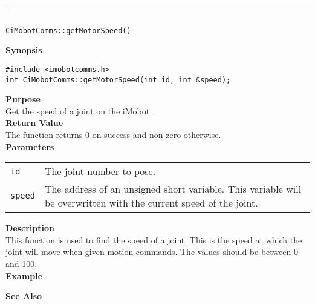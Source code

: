 \noindent
\vspace{5pt}
\rule{4.5in}{0.015in}\\
\noindent
{\LARGE \texttt{CiMobotComms::getMotorSpeed()}}\\
{}

\noindent
{\bf Synopsis}\\
\begin{verbatim}
#include <imobotcomms.h>
int CiMobotComms::getMotorSpeed(int id, int &speed);
\end{verbatim}

\noindent
{\bf Purpose}\\
Get the speed of a joint on the iMobot.\\

\noindent
{\bf Return Value}\\
The function returns 0 on success and non-zero otherwise.\\

\noindent
{\bf Parameters}
\vspace{-0.1in}
\begin{description}
\item               
\begin{tabular}{p{10 mm}p{145 mm}}
\texttt{id} & The joint number to pose. \\
\texttt{speed} & The address of an unsigned short variable. This variable will be overwritten
with the current speed of the joint.
\end{tabular}
\end{description}

\noindent
{\bf Description}\\
This function is used to find the speed of a joint.  This is the speed at which the joint will move when given motion commands. The values should be between 0 and 100. \\

\noindent
{\bf Example}\\
\noindent

\noindent
{\bf See Also}\\

